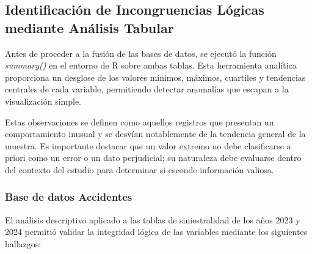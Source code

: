 \documentclass[twoside,a4paper,12pt,onecolumn,openany]{book}
\begin{document}
\subsection{Identificación de Incongruencias Lógicas mediante Análisis Tabular}

Antes de proceder a la fusión de las bases de datos, se ejecutó la función \textit{summary()} en el entorno de R sobre ambas tablas. Esta herramienta analítica proporciona un desglose de los valores mínimos, máximos, cuartiles y tendencias centrales de cada variable, permitiendo detectar anomalías que escapan a la visualización simple.

\vspace{0.5cm}

Estas observaciones se definen como aquellos registros que presentan un comportamiento inusual y se desvían notablemente de la tendencia general de la muestra. Es importante destacar que un valor extremo no debe clasificarse a priori como un error o un dato perjudicial; su naturaleza debe evaluarse dentro del contexto del estudio para determinar si esconde información valiosa. 

\subsubsection{Base de datos Accidentes}
El análisis descriptivo aplicado a las tablas de siniestralidad de los años 2023 y 2024 permitió validar la integridad lógica de las variables mediante los siguientes hallazgos:
\end{document}
